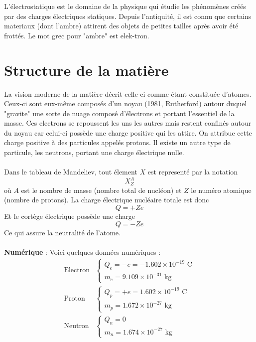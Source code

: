 L'électrostatique est le domaine de la physique qui étudie les phénomènes créés par des charges électriques statiques. Depuis l'antiquité, il est connu que certains materiaux (dont l'ambre) attirent des objets de petites tailles après avoir été frottés. Le mot grec pour "ambre" est elek-tron.

\section{Structure de la matière}

La vision moderne de la matière décrit celle-ci comme étant constituée d'atomes. Ceux-ci sont eux-même composés d'un noyau (1981, Rutherford) autour duquel "gravite" une sorte de nuage composé d'électrons et portant l'essentiel de la masse. Ces electrons se repoussent les uns les autres mais restent confinés autour du noyau car celui-ci possède une charge positive qui les attire. On attribue cette charge positive à des particules appelés protons. Il existe un autre type de particule, les neutrons, portant une charge électrique nulle. \\\\
Dans le tableau de Mandeliev, tout élement $X$ est representé par la notation \[ X^A_Z \] où $A$ est le nombre de masse (nombre total de nucléon) et $Z$ le numéro atomique (nombre de protons). La charge électrique nucléaire totale est donc
\[ Q=+Ze \]
Et le cortège électrique possède une charge \[Q=-Ze\]
Ce qui assure la neutralité de l'atome. \\\\
\noindent \textbf{Numérique} : Voici quelques données numériques :
\[
\begin{array}{ll}
\textrm{Electron} & 
\left\{
\begin{array}{l}
Q_e=-e=-1.602\times 10^{-19} \textrm{ C} \\
m_e=9.109\times 10^{-31}\textrm{ kg}
\end{array}
\right. \\
\textrm{Proton} & 
\left\{
\begin{array}{l}
Q_p=+e=1.602\times 10^{-19} \textrm{ C} \\
m_p=1.672\times 10^{-27} \textrm{ kg}
\end{array}
\right.
\\
\textrm{Neutron} & 
\left\{
\begin{array}{l}
Q_n=0 \\
m_n=1.674 \times 10^{-27} \textrm{ kg}
\end{array}
\right.
\\
\end{array}
\]

